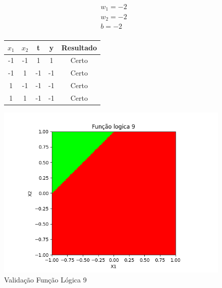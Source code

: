 \begin{figure}[h!]
\centering
\begin{minipage}[c]{0.49\linewidth}
\centering
\[
\begin{aligned}
&w_1 = -2\\
&w_2 = -2\\
&b = -2\\
\end{aligned}
\]
\begin{tabular}{|c|c|c|c|c|}\hline
$x_1$ & $x_2$ & t & y & Resultado\\ \hline
 -1 & -1 & 1 & 1 & Certo\\ \hline
 -1 & 1 & -1 & -1 & Certo\\ \hline
 1 & -1 & -1 & -1 & Certo\\ \hline
 1 & 1 & -1 & -1 & Certo\\ \hline
\end{tabular}
\end{minipage}
\hfill
\begin{minipage}[c]{0.5\linewidth}
\centering
\singlespacing
\includegraphics[width=1.2\textwidth]{im/im9}
\end{minipage}
\caption{Validação Função Lógica 9}
\label{vl9}
\end{figure}

